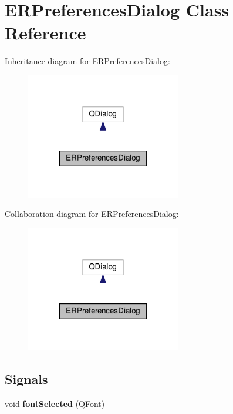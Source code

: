 \hypertarget{classERPreferencesDialog}{}\section{E\+R\+Preferences\+Dialog Class Reference}
\label{classERPreferencesDialog}


Inheritance diagram for E\+R\+Preferences\+Dialog\+:\nopagebreak
\begin{figure}[H]
\begin{center}
\leavevmode
\includegraphics[width=191pt]{classERPreferencesDialog__inherit__graph}
\end{center}
\end{figure}


Collaboration diagram for E\+R\+Preferences\+Dialog\+:\nopagebreak
\begin{figure}[H]
\begin{center}
\leavevmode
\includegraphics[width=191pt]{classERPreferencesDialog__coll__graph}
\end{center}
\end{figure}
\subsection*{Signals}
\begin{DoxyCompactItemize}
\item 
void {\bfseries font\+Selected} (Q\+Font)\hypertarget{classERPreferencesDialog_a3d144f0765745dc2eac4509f83e459d4}{}\label{classERPreferencesDialog_a3d144f0765745dc2eac4509f83e459d4}

\end{DoxyCompactItemize}
